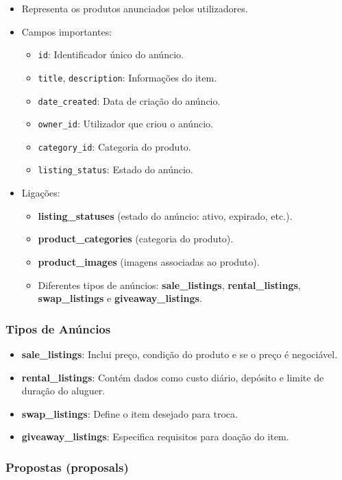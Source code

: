 \documentclass[a4paper, 12pt]{article} %
\begin{document}
\begin{itemize}
	\item Representa os produtos anunciados pelos utilizadores.
	\item Campos importantes:
	\begin{itemize}
		\item \verb|id|: Identificador único do anúncio.
		\item \verb|title|, \verb|description|: Informações do item.
		\item \verb|date_created|: Data de criação do anúncio.
		\item \verb|owner_id|: Utilizador que criou o anúncio.
		\item \verb|category_id|: Categoria do produto.
		\item \verb|listing_status|: Estado do anúncio.
	\end{itemize}
	\item Ligações:
	\begin{itemize}
		\item \textbf{listing\_statuses} (estado do anúncio: ativo, expirado, etc.).
		\item \textbf{product\_categories} (categoria do produto).
		\item \textbf{product\_images} (imagens associadas ao produto).
		\item Diferentes tipos de anúncios: \textbf{sale\_listings}, \textbf{rental\_listings}, \textbf{swap\_listings} e \textbf{giveaway\_listings}.
	\end{itemize}
\end{itemize}

\subsubsection{\textbf{Tipos de Anúncios}}

\begin{itemize}
	\item \textbf{sale\_listings}: Inclui preço, condição do produto e se o preço é negociável.
	\item \textbf{rental\_listings}: Contém dados como custo diário, depósito e limite de duração do aluguer.
	\item \textbf{swap\_listings}: Define o item desejado para troca.
	\item \textbf{giveaway\_listings}: Especifica requisitos para doação do item.
\end{itemize}

\subsubsection{\textbf{Propostas (proposals)}}
\end{document}
